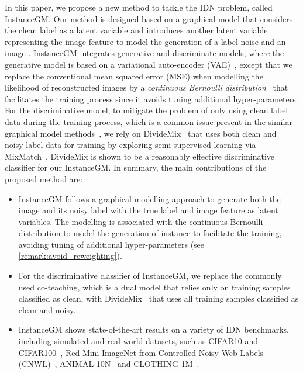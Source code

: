 \documentclass[10pt,twocolumn,letterpaper]{article}
\begin{document}
In this paper, we propose a new method to tackle the IDN problem, called InstanceGM. Our method is designed based on a graphical model that considers the clean label  as a latent variable and introduces another latent variable  representing the image feature to model the generation of a label noise  and an image . 
InstanceGM integrates generative and discriminate models, where the generative model is based on a variational auto-encoder (VAE)~\cite{kingma2013auto}, except that we replace the conventional mean squared error (MSE) when modelling the likelihood of reconstructed images by a  \emph{continuous Bernoulli distribution}~\cite{loaiza2019continuous} that facilitates the training process since it avoids tuning additional hyper-parameters. 
For the discriminative model, to mitigate the problem of 
only using clean label data during the training process, which is a common issue present in the similar graphical model methods~\cite{yao2021instance}, we rely on  DivideMix~\cite{li2020dividemix} that uses both clean and noisy-label data for training by exploring semi-supervised learning via MixMatch~\cite{berthelot2019mixmatch}. DivideMix is shown to be a reasonably effective discriminative classifier for our InstanceGM.
In summary, the main contributions of the proposed method are:
\begin{itemize}
    \item InstanceGM follows a graphical modelling approach to generate both the image  and its noisy label  with the true label  and image feature  as latent variables. The modelling is associated with the continuous Bernoulli distribution to model the generation of instance  to facilitate the training, avoiding tuning of additional hyper-parameters (see \cref{remark:avoid_reweighting}).
\item For the discriminative classifier of InstanceGM, we replace the commonly used
    co-teaching, which is a dual model that relies only on training samples classified as clean, with DivideMix~\cite{li2020dividemix} that uses all training samples classified as clean and noisy. 
\item InstanceGM shows state-of-the-art results on a variety of IDN benchmarks, including simulated and real-world datasets, such as CIFAR10 and CIFAR100~\cite{krizhevsky2009learning}, Red Mini-ImageNet from Controlled Noisy Web Labels (CNWL)~\cite{xu2021faster}, ANIMAL-10N~\cite{song2019selfie} and CLOTHING-1M~\cite{xiao2015learning}.
\end{itemize}
\end{document}
